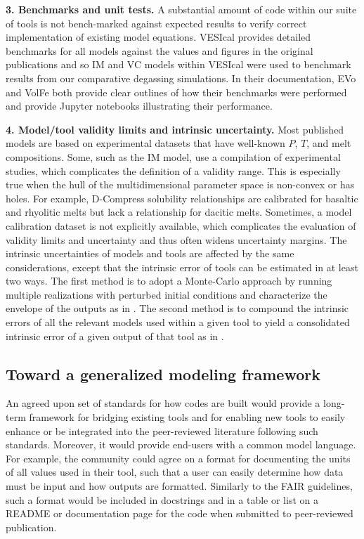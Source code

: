 \documentclass[draft, english]{volcanica-template}
\begin{document}
\textbf{3. Benchmarks and unit tests.} A substantial amount of code within our suite of tools is not bench-marked against expected results to verify correct implementation of existing model equations. VESIcal provides detailed benchmarks for all models against the values and figures in the original publications and so IM and VC models within VESIcal were used to benchmark results from our comparative degassing simulations. In their documentation, EVo and VolFe both provide clear outlines of how their benchmarks were performed and provide Jupyter notebooks illustrating their performance.

\textbf{4. Model/tool validity limits and intrinsic uncertainty.} Most published models are based on experimental datasets that have well-known $P$, $T$, and melt compositions. Some, such as the IM model, use a compilation of experimental studies, which complicates the definition of a validity range. This is especially true when the hull of the multidimensional parameter space is non-convex or has holes. For example, D-Compress solubility relationships are calibrated for basaltic and rhyolitic melts but lack a relationship for dacitic melts. Sometimes, a model calibration dataset is not explicitly available, which complicates the evaluation of validity limits and uncertainty and thus often widens uncertainty margins. The intrinsic uncertainties of models and tools are affected by the same considerations, except that the intrinsic error of tools can be estimated in at least two ways. The first method is to adopt a Monte-Carlo approach by running multiple realizations with perturbed initial conditions and characterize the envelope of the outputs as in \textcite{hughes2026evaluation}. The second method is to compound the intrinsic errors of all the relevant models used within a given tool to yield a consolidated intrinsic error of a given output of that tool as in \textcite{Burgisser2015}. 

\subsection{Toward a generalized modeling framework}
An agreed upon set of standards for how codes are built would provide a long-term framework for bridging existing tools and for enabling new tools to easily enhance or be integrated into the peer-reviewed literature following such standards. Moreover, it would provide end-users with a common model language. For example, the community could agree on a format for documenting the units of all values used in their tool, such that a user can easily determine how data must be input and how outputs are formatted. Similarly to the FAIR guidelines, such a format would be included in docstrings and in a table or list on a README or documentation page for the code when submitted to peer-reviewed publication. 
\end{document}
